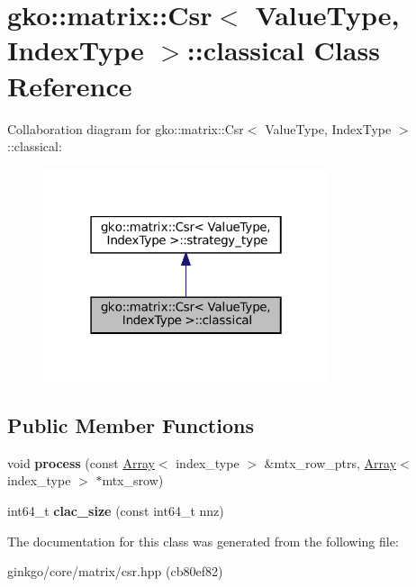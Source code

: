\hypertarget{classgko_1_1matrix_1_1Csr_1_1classical}{}\section{gko\+:\+:matrix\+:\+:Csr$<$ Value\+Type, Index\+Type $>$\+:\+:classical Class Reference}
\label{classgko_1_1matrix_1_1Csr_1_1classical}


Collaboration diagram for gko\+:\+:matrix\+:\+:Csr$<$ Value\+Type, Index\+Type $>$\+:\+:classical\+:
\nopagebreak
\begin{figure}[H]
\begin{center}
\leavevmode
\includegraphics[width=238pt]{classgko_1_1matrix_1_1Csr_1_1classical__coll__graph}
\end{center}
\end{figure}
\subsection*{Public Member Functions}
\begin{DoxyCompactItemize}
\item 
\mbox{\label{classgko_1_1matrix_1_1Csr_1_1classical_a3d2766e56763c491948818e0f3da4356}} 
void {\bfseries process} (const \hyperlink{classgko_1_1Array}{Array}$<$ index\+\_\+type $>$ \&mtx\+\_\+row\+\_\+ptrs, \hyperlink{classgko_1_1Array}{Array}$<$ index\+\_\+type $>$ $\ast$mtx\+\_\+srow)
\item 
\mbox{\label{classgko_1_1matrix_1_1Csr_1_1classical_a790b475b079d3d97de776e968f459f41}} 
int64\+\_\+t {\bfseries clac\+\_\+size} (const int64\+\_\+t nnz)
\end{DoxyCompactItemize}


The documentation for this class was generated from the following file\+:\begin{DoxyCompactItemize}
\item 
ginkgo/core/matrix/csr.\+hpp (cb80ef82)\end{DoxyCompactItemize}
